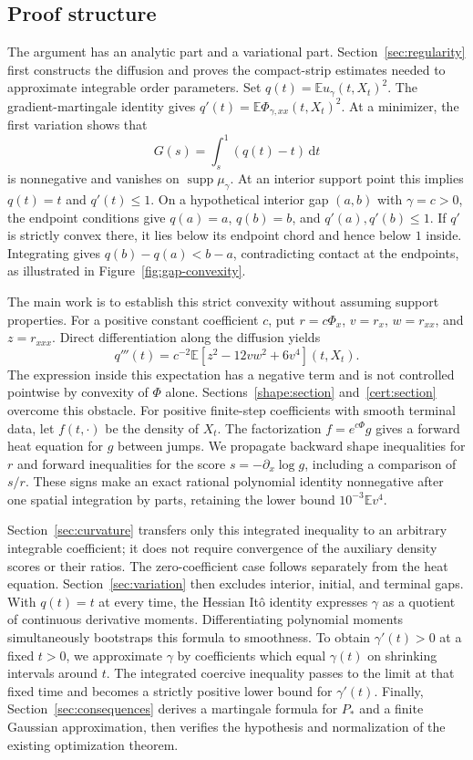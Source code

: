 \documentclass[11pt]{article}
\newcommand{\E}{\mathbb E}
\newcommand{\dd}{\mathrm d}
\DeclareMathOperator{\supp}{supp}
\theoremstyle{remark}
\numberwithin{equation}{section}
\begin{document}
\subsection{Proof structure}
The argument has an analytic part and a variational part.
Section~\ref{sec:regularity} first constructs the diffusion and proves
the compact-strip estimates needed to approximate integrable order
parameters. Set $q(t)=\E u_\gamma(t,X_t)^2$. The gradient-martingale identity gives
$q'(t)=\E\Phi_{\gamma,xx}(t,X_t)^2$. At a minimizer, the first variation
shows that
\[
 G(s)=\int_s^1(q(t)-t)\,\dd t
\]
is nonnegative and vanishes on $\supp\mu_\gamma$. At an interior support
point this implies $q(t)=t$ and $q'(t)\leq1$.
On a hypothetical interior gap $(a,b)$ with $\gamma=c>0$, the endpoint
conditions give $q(a)=a$, $q(b)=b$, and $q'(a),q'(b)\leq1$.
If $q'$ is strictly convex there, it lies below its endpoint chord and
hence below $1$ inside. Integrating gives $q(b)-q(a)<b-a$, contradicting
contact at the endpoints, as illustrated in Figure~\ref{fig:gap-convexity}.


The main work is to establish this strict convexity without assuming
support properties. For a positive constant coefficient $c$, put
$r=c\Phi_x$, $v=r_x$, $w=r_{xx}$, and $z=r_{xxx}$.
Direct differentiation along the diffusion yields
\[
 q'''(t)=c^{-2}\E[z^2-12vw^2+6v^4](t,X_t).
\]
The expression inside this expectation has a negative term and is not
controlled pointwise by convexity of $\Phi$ alone.
Sections~\ref{shape:section} and~\ref{cert:section} overcome this
obstacle. For positive finite-step coefficients with smooth terminal
data, let $f(t,\cdot)$ be the density of $X_t$. The factorization
$f=e^{c\Phi}g$ gives a forward heat equation for $g$ between jumps.
We propagate backward shape inequalities for $r$ and forward inequalities
for the score $s=-\partial_x\log g$, including a comparison of $s/r$.
These signs make an exact rational polynomial identity nonnegative
after one spatial integration by parts, retaining the lower bound
$10^{-3}\E v^4$.

Section~\ref{sec:curvature} transfers only this integrated inequality
to an arbitrary integrable coefficient; it does not require convergence
of the auxiliary density scores or their ratios. The zero-coefficient
case follows separately from the heat equation. Section~\ref{sec:variation}
then excludes interior, initial, and terminal gaps. With $q(t)=t$ at
every time, the Hessian It\^o identity expresses $\gamma$ as a
quotient of continuous derivative moments. Differentiating polynomial
moments simultaneously bootstraps this formula to smoothness.
To obtain $\gamma'(t)>0$ at a fixed $t>0$, we approximate $\gamma$ by
coefficients which equal $\gamma(t)$ on shrinking intervals around $t$.
The integrated coercive inequality passes to the limit at that fixed
time and becomes a strictly positive lower bound for $\gamma'(t)$.
Finally, Section~\ref{sec:consequences} derives a martingale formula
for $P_*$ and a finite Gaussian approximation, then verifies the
hypothesis and normalization of the existing optimization theorem.











\end{document}
